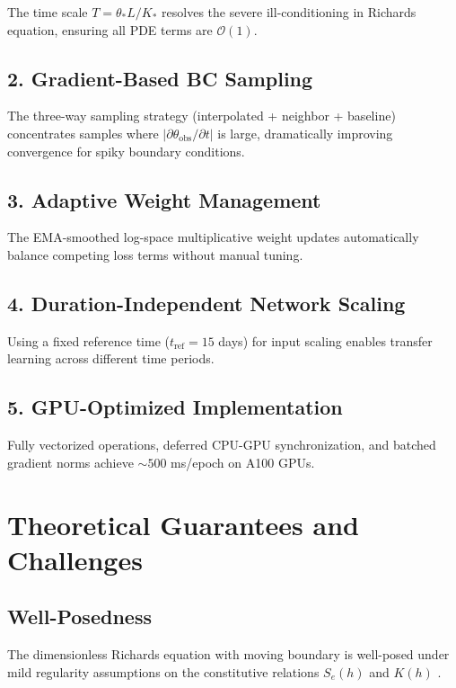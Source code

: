 \documentclass[11pt,a4paper]{article}
\begin{document}
The time scale $T = \theta_* L / K_*$ resolves the severe ill-conditioning in Richards equation, ensuring all PDE terms are $\mathcal{O}(1)$.

\subsection{2. Gradient-Based BC Sampling}

The three-way sampling strategy (interpolated + neighbor + baseline) concentrates samples where $|\partial \theta_{\text{obs}} / \partial t|$ is large, dramatically improving convergence for spiky boundary conditions.

\subsection{3. Adaptive Weight Management}

The EMA-smoothed log-space multiplicative weight updates automatically balance competing loss terms without manual tuning.

\subsection{4. Duration-Independent Network Scaling}

Using a fixed reference time ($t_{\text{ref}} = 15$ days) for input scaling enables transfer learning across different time periods.

\subsection{5. GPU-Optimized Implementation}

Fully vectorized operations, deferred CPU-GPU synchronization, and batched gradient norms achieve $\sim 500$ ms/epoch on A100 GPUs.

\section{Theoretical Guarantees and Challenges}

\subsection{Well-Posedness}

The dimensionless Richards equation with moving boundary is well-posed under mild regularity assumptions on the constitutive relations $S_e(h)$ and $K(h)$ \cite{Alt1985}.
\end{document}
